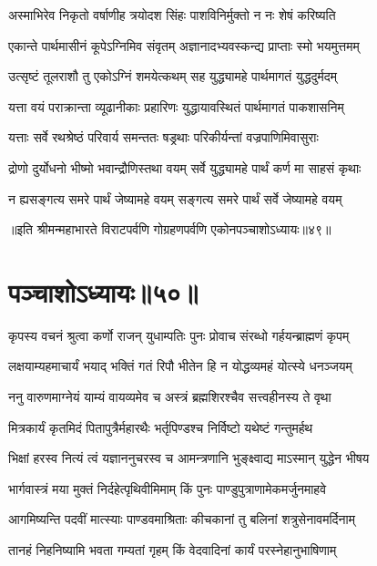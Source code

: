 \twolineshloka
{अस्माभिरेव निकृतो वर्षाणीह त्रयोदश}
{सिंहः पाशविनिर्मुक्तो न नः शेषं करिष्यति}


\twolineshloka
{एकान्ते पार्थमासीनं कूपेऽग्निमिव संवृतम्}
{अज्ञानादभ्यवस्कन्द्य प्राप्ताः स्मो भयमुत्तमम्}


\twolineshloka
{उत्सृष्टं तूलराशौ तु एकोऽग्निं शमयेत्कथम्}
{सह युद्ध्यामहे पार्थमागतं युद्धदुर्मदम्}


\twolineshloka
{यत्ता वयं पराक्रान्ता व्यूढानीकाः प्रहारिणः}
{युद्धायावस्थितं पार्थमागतं पाकशासनिम्}


\twolineshloka
{यत्ताः सर्वे रथश्रेष्ठं परिवार्य समन्ततः}
{षड्रथाः परिकीर्यन्तां वज्रपाणिमिवासुराः}


\twolineshloka
{द्रोणो दुर्योधनो भीष्मो भवान्द्रौणिस्तथा वयम्}
{सर्वे युद्ध्यामहे पार्थं कर्ण मा साहसं कृथाः}


\twolineshloka
{न ह्यसङ्गत्य समरे पार्थं जेष्यामहे वयम्}
{सङ्गत्य समरे पार्थं सर्वे जेष्यामहे वयम्}

॥इति श्रीमन्महाभारते विराटपर्वणि गोग्रहणपर्वणि एकोनपञ्चाशोऽध्यायः॥४९॥

\chapter{पञ्चाशोऽध्यायः॥५०॥}

\twolineshloka
{कृपस्य वचनं श्रुत्वा कर्णो राजन् युधाम्पतिः}
{पुनः प्रोवाच संरब्धो गर्हयन्ब्राह्मणं कृपम्}




\twolineshloka
{लक्षयाम्यहमाचार्यं भयाद् भक्तिं गतं रिपौ}
{भीतेन हि न योद्धव्यमहं योत्स्ये धनञ्जयम्}


\twolineshloka
{ननु वारुणमाग्नेयं याम्यं वायव्यमेव च}
{अस्त्रं ब्रह्मशिरश्चैव सत्त्वहीनस्य ते वृथा}


\twolineshloka
{मित्रकार्यं कृतमिदं पितापुत्रैर्महारथैः}
{भर्तृपिण्डश्च निर्विष्टो यथेष्टं गन्तुमर्हथ}


\twolineshloka
{भिक्षां हरस्व नित्यं त्वं यज्ञाननुचरस्व च}
{आमन्त्रणानि भुङ्क्ष्वाद्य माऽस्मान् युद्धेन भीषय}


\twolineshloka
{भार्गवास्त्रं मया मुक्तं निर्दहेत्पृथिवीमिमाम्}
{किं पुनः पाण्डुपुत्राणामेकमर्जुनमाहवे}


\twolineshloka
{आगमिष्यन्ति पदवीं मात्स्याः पाण्डवमाश्रिताः}
{कीचकानां तु बलिनां शत्रुसेनावमर्दिनाम्}


\twolineshloka
{तानहं निहनिष्यामि भवता गम्यतां गृहम्}
{किं वेदवादिनां कार्यं परस्नेहानुभाषिणाम्}



